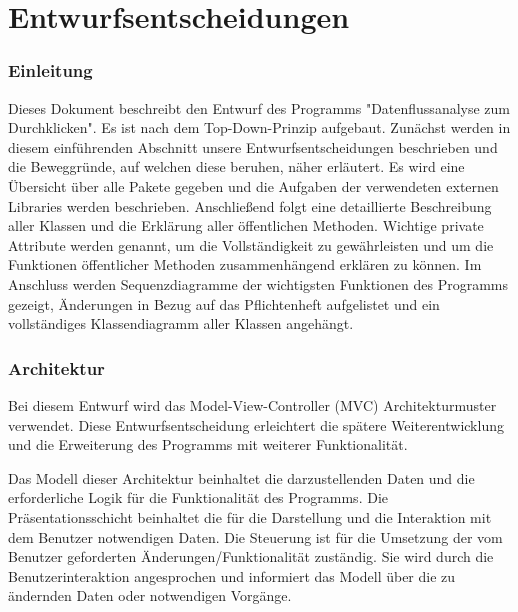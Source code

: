 \part{Entwurfsentscheidungen}

\section{Einleitung}
Dieses Dokument beschreibt den Entwurf des Programms "Datenflussanalyse zum Durchklicken". Es ist nach dem Top-Down-Prinzip aufgebaut. 
Zunächst werden in diesem einführenden Abschnitt unsere Entwurfsentscheidungen beschrieben und die Beweggründe, auf welchen diese beruhen, näher erläutert.
Es wird eine Übersicht über alle Pakete gegeben und die Aufgaben der verwendeten externen Libraries werden beschrieben. 
Anschließend folgt eine detaillierte Beschreibung aller Klassen und die Erklärung aller öffentlichen Methoden. 
Wichtige private Attribute werden genannt, um die Vollständigkeit zu gewährleisten und um die Funktionen öffentlicher Methoden zusammenhängend erklären zu können. 
Im Anschluss werden Sequenzdiagramme der wichtigsten Funktionen des Programms gezeigt, Änderungen in Bezug auf das Pflichtenheft aufgelistet und ein vollständiges Klassendiagramm aller Klassen angehängt.

\section{Architektur}
Bei diesem Entwurf wird das Model-View-Controller (MVC) Architekturmuster verwendet. 
Diese Entwurfsentscheidung erleichtert die spätere Weiterentwicklung und die Erweiterung des Programms mit weiterer Funktionalität. \par
Das Modell dieser Architektur beinhaltet die darzustellenden Daten und die erforderliche Logik für die Funktionalität des Programms. 
Die Präsentationsschicht beinhaltet die für die Darstellung und die Interaktion mit dem Benutzer notwendigen Daten. Die Steuerung ist für die Umsetzung der vom Benutzer geforderten Änderungen/Funktionalität zuständig. 
Sie wird durch die Benutzerinteraktion angesprochen und informiert das Modell über die zu ändernden Daten oder notwendigen Vorgänge.

